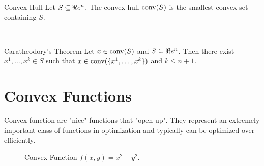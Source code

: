 \begin{definition}{Convex Hull}{}
Let $S\subseteq \Re e^n$.  The convex hull $\textup{conv}(S)$ is the smallest convex set containing $S$.
\end{definition}

\begin{figure}[H]
\begin{center}
 \ \ 
\end{center}
\end{figure}
\begin{theorem}{Caratheodory's Theorem}{}
Let $x \in \textup{conv}(S)$ and $S \subseteq \Re e^n$.  Then there exist $x^1, \dots, x^k \in S$ such that $x \in \textup{conv}(\{x^1, \dots, x^k\})$ and $k \leq n+1$.
\end{theorem}




\section{Convex Functions}


Convex function are "nice" functions that "open up".  They represent an extremely important class of functions in optimization and typically can be optimized over efficiently.


\begin{figure}[H]
\begin{center}
\end{center}
    \caption{Convex Function $f(x,y) = x^2 + y^2$.}
\end{figure} 


